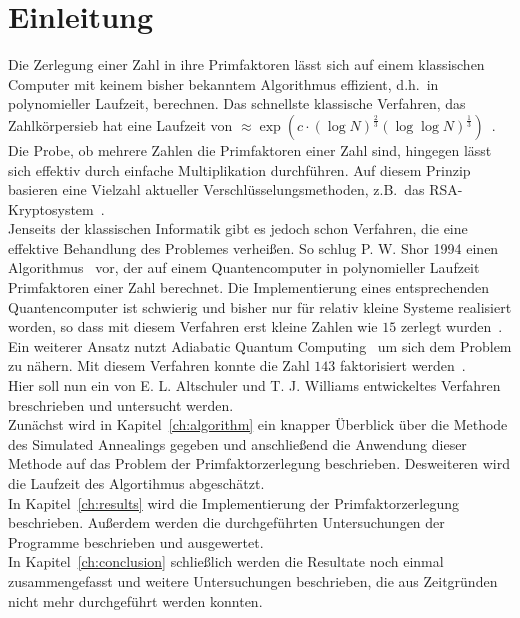 \chapter{Einleitung}
Die Zerlegung einer Zahl in ihre Primfaktoren lässt sich auf einem klassischen Computer mit keinem bisher bekanntem Algorithmus effizient, d.h.\ in polynomieller Laufzeit, berechnen. Das schnellste klassische Verfahren, das Zahlkörpersieb hat eine Laufzeit von $\approx\exp\left(c\cdot{\left(\log N\right)}^\frac{2}{3}{\left(\log\log N\right)}^\frac{1}{3}\right)$~\parencite{pomerance}.\\
Die Probe, ob mehrere Zahlen die Primfaktoren einer Zahl sind, hingegen lässt sich effektiv durch einfache Multiplikation durchführen. Auf diesem Prinzip basieren eine Vielzahl aktueller Verschlüsselungsmethoden, z.B.\ das RSA-Kryptosystem~\parencite{rsa}. \\
Jenseits der klassischen Informatik gibt es jedoch schon Verfahren, die eine effektive Behandlung des Problemes verheißen. So schlug P. W. Shor 1994 einen Algorithmus~\parencite{shor} vor, der auf einem Quantencomputer in polynomieller Laufzeit Primfaktoren einer Zahl berechnet. Die Implementierung eines entsprechenden Quantencomputer ist schwierig und bisher nur für relativ kleine Systeme realisiert worden, so dass mit diesem Verfahren erst kleine Zahlen wie $15$ zerlegt wurden~\parencite{vandersypen}.\\
Ein weiterer Ansatz nutzt Adiabatic Quantum Computing~\parencite{suter} um sich dem Problem zu nähern. Mit diesem Verfahren konnte die Zahl $143$ faktorisiert werden~\parencite{xu}. \\
Hier soll nun ein von E. L. Altschuler und T. J. Williams entwickeltes Verfahren~\parencite{altschuler} breschrieben und untersucht werden.\\
Zunächst wird in Kapitel~\ref{ch:algorithm} ein knapper Überblick über die Methode des Simulated Annealings gegeben und anschließend die Anwendung dieser Methode auf das Problem der Primfaktorzerlegung beschrieben. Desweiteren wird die Laufzeit des Algortihmus abgeschätzt.\\
In Kapitel~\ref{ch:results} wird die Implementierung der Primfaktorzerlegung beschrieben. Außerdem werden die durchgeführten Untersuchungen der Programme beschrieben und ausgewertet.\\
In Kapitel~\ref{ch:conclusion} schließlich werden die Resultate noch einmal zusammengefasst und weitere Untersuchungen beschrieben, die aus Zeitgründen nicht mehr durchgeführt werden konnten.
